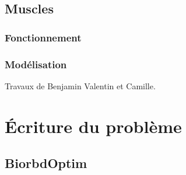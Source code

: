         \section{Muscles}
            \subsection{Fonctionnement}
            \subsection{Modélisation}
Travaux de Benjamin Valentin et Camille.
    \chapter{\'Ecriture du problème}
        \section{BiorbdOptim}
